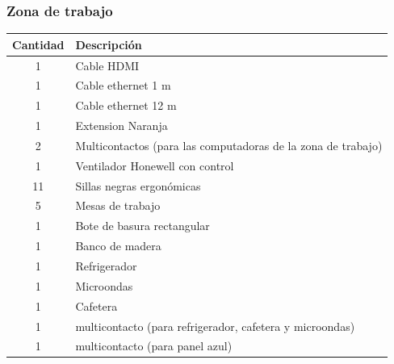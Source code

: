 \documentclass[a4paper,11pt]{article}                 %
\begin{document}
  \subsubsection{Zona de trabajo}
    \begin{table}[H]
    \centering
    \begin{tabular}{|c|l|}
    \hline
    Cantidad & Descripción                                                  \\ \hline
    1        & Cable HDMI                                                   \\ \hline
    1        & Cable ethernet 1 m                                           \\ \hline
    1        & Cable ethernet 12 m                                          \\ \hline
    1        & Extension Naranja                                            \\ \hline
    2        & Multicontactos (para las computadoras de la zona de trabajo) \\ \hline
    1        & Ventilador Honewell con control                              \\ \hline
    11       & Sillas negras ergonómicas                                    \\ \hline
    5        & Mesas de trabajo                                             \\ \hline
    1        & Bote de basura rectangular                                   \\ \hline
    1        & Banco de madera                                              \\ \hline
    1        & Refrigerador                                                 \\ \hline
    1        & Microondas                                                   \\ \hline
    1        & Cafetera                                                     \\ \hline
    1        & multicontacto (para refrigerador, cafetera y microondas)     \\ \hline
    1        & multicontacto (para panel azul)                              \\ \hline
    \end{tabular}
    \end{table}
\end{document}
